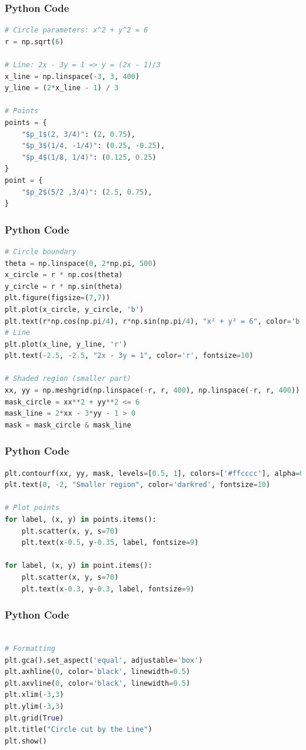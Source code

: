 \documentclass{beamer}
\begin{document}
\begin{frame}[fragile]
  \frametitle{Python Code}
  \begin{lstlisting}[language=Python]
# Circle parameters: x^2 + y^2 = 6
r = np.sqrt(6)

# Line: 2x - 3y = 1 => y = (2x - 1)/3
x_line = np.linspace(-3, 3, 400)
y_line = (2*x_line - 1) / 3

# Points
points = {
    "$p_1$(2, 3/4)": (2, 0.75),
    "$p_3$(1/4, -1/4)": (0.25, -0.25),
    "$p_4$(1/8, 1/4)": (0.125, 0.25)
}
point = {
    "$p_2$(5/2 ,3/4)": (2.5, 0.75),
}
  \end{lstlisting}
\end{frame}
\begin{frame}[fragile]
  \frametitle{Python Code}
  \begin{lstlisting}[language=Python]
# Circle boundary
theta = np.linspace(0, 2*np.pi, 500)
x_circle = r * np.cos(theta)
y_circle = r * np.sin(theta)
plt.figure(figsize=(7,7))
plt.plot(x_circle, y_circle, 'b')
plt.text(r*np.cos(np.pi/4), r*np.sin(np.pi/4), "x² + y² = 6", color='b', fontsize=10)
# Line
plt.plot(x_line, y_line, 'r')
plt.text(-2.5, -2.5, "2x - 3y = 1", color='r', fontsize=10)

# Shaded region (smaller part)
xx, yy = np.meshgrid(np.linspace(-r, r, 400), np.linspace(-r, r, 400))
mask_circle = xx**2 + yy**2 <= 6
mask_line = 2*xx - 3*yy - 1 > 0
mask = mask_circle & mask_line
  \end{lstlisting}
\end{frame}

\begin{frame}[fragile]
  \frametitle{Python Code}
  \begin{lstlisting}[language=Python]
plt.contourf(xx, yy, mask, levels=[0.5, 1], colors=['#ffcccc'], alpha=0.5)
plt.text(0, -2, "Smaller region", color='darkred', fontsize=10)

# Plot points
for label, (x, y) in points.items():
    plt.scatter(x, y, s=70)
    plt.text(x-0.5, y-0.35, label, fontsize=9)

for label, (x, y) in point.items():
    plt.scatter(x, y, s=70)
    plt.text(x-0.3, y-0.3, label, fontsize=9)

  \end{lstlisting}
\end{frame}
\begin{frame}[fragile]
  \frametitle{Python Code}
  \begin{lstlisting}[language=Python]

# Formatting
plt.gca().set_aspect('equal', adjustable='box')
plt.axhline(0, color='black', linewidth=0.5)
plt.axvline(0, color='black', linewidth=0.5)
plt.xlim(-3,3)
plt.ylim(-3,3)
plt.grid(True)
plt.title("Circle cut by the Line")
plt.show()
  \end{lstlisting}
\end{frame}
\end{document}
